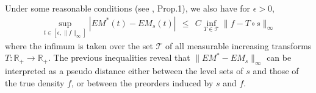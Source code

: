 Under some reasonable conditions (see \cite{AISTAT15}, Prop.1), we also have 
for $\epsilon >0$, 
\begin{align*}
\sup_{t\in[\epsilon ,\|f\|_\infty]}|EM^*(t)-EM_s(t)| ~~\le~~  C \inf_{T  \in \mathcal{T}} \|f-T\circ s\|_\infty
\end{align*}
where the infimum is taken over the set $\mathcal{T}$ of all measurable increasing transforms $T : \mathbb{R}_+ \rightarrow \mathbb{R}_+$.
The previous inequalities reveal that $\|EM^* - EM_s\|_\infty$ can be interpreted as a pseudo distance either between the level sets of $s$ and those of the true density $f$, or between the preorders induced by $s$ and $f$. %


